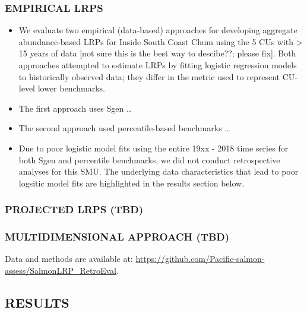 \documentclass[11pt]{book}
\begin{document}
\hypertarget{empirical-lrps-2}{%
\subsubsection{EMPIRICAL LRPS}\label{empirical-lrps-2}}
\begin{itemize}
\item
  We evaluate two empirical (data-based) approaches for developing aggregate abundance-based LRPs for Inside South Coast Chum using the 5 CUs with \textgreater{} 15 years of data {[}not sure this is the best way to descibe??; please fix{]}. Both approaches attempted to estimate LRPs by fitting logistic regression models to historically observed data; they differ in the metric used to represent CU-level lower benchmarks.
\item
  The first approach uses Sgen \ldots{}
\item
  The second approach used percentile-based benchmarks \ldots{}
\item
  Due to poor logistic model fits using the entire 19xx - 2018 time series for both Sgen and percentile benchmarks, we did not conduct retrospective analyses for this SMU. The underlying data characteristics that lead to poor logsitic model fits are highlighted in the results section below.
\end{itemize}
\hypertarget{projected-lrps-tbd}{%
\subsubsection{PROJECTED LRPS (TBD)}\label{projected-lrps-tbd}}

\hypertarget{multidimensional-approach-tbd}{%
\subsubsection{MULTIDIMENSIONAL APPROACH (TBD)}\label{multidimensional-approach-tbd}}

Data and methods are available at: \url{https://github.com/Pacific-salmon-assess/SalmonLRP_RetroEval}.

\hypertarget{results-2}{%
\subsection{RESULTS}\label{results-2}}
\end{document}
